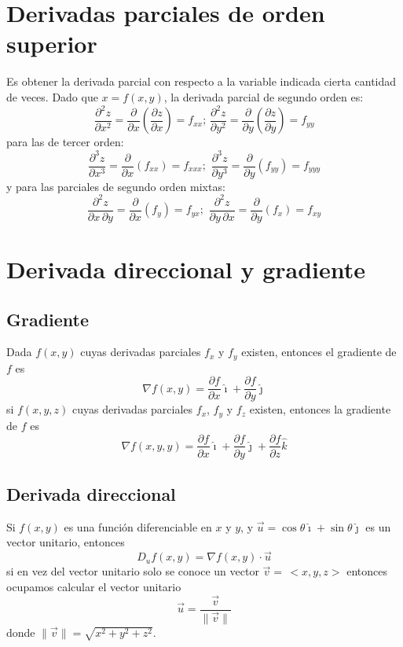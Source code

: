 \documentclass[letterpaper, 12pt]{article}
\begin{document}
        \section{Derivadas parciales de orden superior}
        \justify
        Es obtener la derivada parcial con respecto a la variable indicada cierta cantidad de veces. Dado que \(x=f(x,y)\), la derivada parcial de segundo orden es:
        \[\frac{\partial^2 z}{\partial x^2}=\frac{\partial}{\partial x}\left(\frac{\partial z}{\partial x}\right)=f_{xx};\,\frac{\partial^2 z}{\partial y^2}=\frac{\partial }{\partial y}\left(\frac{\partial z}{\partial y}\right)=f_{yy}\]
        para las de tercer orden:
        \[\frac{\partial^3 z}{\partial x^3}=\frac{\partial}{\partial x}\left(f_{xx}\right)=f_{xxx};\,\, \frac{\partial^3 z}{\partial y^3}=\frac{\partial}{\partial y}\left(f_{yy}\right)=f_{yyy}\]
        y para las parciales de segundo orden mixtas:
        \[\frac{\partial^2z}{\partial x\,\partial y}=\frac{\partial}{\partial x}\left(f_y\right)=f_{yx};\,\, \frac{\partial^2 z}{\partial y\,\partial x}=\frac{\partial}{\partial y}\left(f_x\right)=f_{xy}\]
        \section{Derivada direccional y gradiente}
        \subsection*{Gradiente}
        \justify
        Dada \(f(x,y)\) cuyas derivadas parciales \(f_x\) y \(f_y\) existen, entonces el gradiente de \(f\) es
        \[\nabla f(x,y)=\frac{\partial f}{\partial x}\hat{\imath}+\frac{\partial f}{\partial y}\hat{\jmath}\]
        si \(f(x,y,z)\) cuyas derivadas parciales \(f_x\), \(f_y\) y \(f_z\) existen, entonces la gradiente de \(f\) es
        \[\nabla f(x,y,y)=\frac{\partial f}{\partial x}\hat{\imath}+\frac{\partial f}{\partial y}\hat{\jmath}+\frac{\partial f}{\partial z}\hat{k}\]
        \subsection*{Derivada direccional}
        \justify
        Si \(f(x,y)\) es una función diferenciable en \(x\) y \(y\), y \(\vec{u}=\cos \theta \hat{\imath}+\sin \theta \hat{\jmath}\) es un vector unitario, entonces
        \[D_uf(x,y)=\nabla f(x,y)\cdot \vec{u}\]
        si en vez del vector unitario solo se conoce un vector \(\vec{v}=\,<\!x,y,z\!>\) entonces ocupamos calcular el vector unitario
        \[\vec{u}=\frac{\vec{v}}{\lVert\vec{v}\rVert}\]
        donde \(\lVert\vec{v}\lVert=\sqrt{x^2+y^2+z^2}\).
\end{document}
